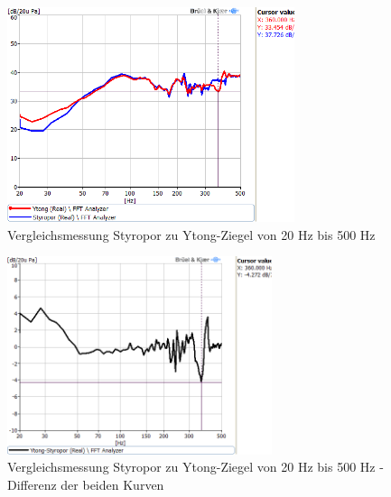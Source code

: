 \begin{figure} [H]
	\centering
	\includegraphics[width=0.75\textwidth]{img/Optimierung/Vergleich/VergleichYtognStyro_500Hz.png}
	\caption{Vergleichsmessung Styropor zu Ytong-Ziegel von 20 Hz bis 500 Hz}
	\label{fig:4.4.1.3}
\end{figure}
\begin{figure} [H]
	\centering
	\includegraphics[width=0.69\textwidth]{img/Optimierung/Vergleich/VergleichYtognStyro_Abweichung_500Hz.png}
	\caption{Vergleichsmessung Styropor zu Ytong-Ziegel von 20 Hz bis 500 Hz - Differenz der beiden Kurven}
	\label{fig:4.4.1.4}
\end{figure}


